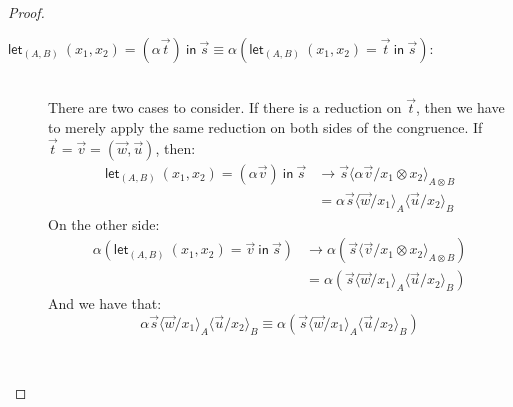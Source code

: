 \documentclass[runningheads,orivec]{llncs}
\newcommand\ansubst[2]{\ensuremath{\langle #1 \rangle_{#2}}}
\def\Pair#1#2{(#1,#2)} %
\def\letkeyword{\mathsf{let}}
\def\inkeyword{\mathsf{in}}
\def\LetP#1#2#3#4#5#6{\letkeyword_{\Pair{#2}{#4}}~\Pair{#1}{#3}=#5~\inkeyword~#6}
\def\evalone{\rightarrow}
\begin{document}
\begin{proof}
\begin{description}
    \item[$\LetP{x_1}{A}{x_2}{B}{(\alpha \vec{t})}{\vec{s}}\equiv\alpha(\LetP{x_1}{A}{x_2}{B}{\vec{t}}{\vec{s}})$:] \hfill\\
    There are two cases to consider. If there is a reduction on $\vec{t}$, then we have to merely apply the same reduction on both sides of the congruence. If $\vec{t}=\vec{v}=\Pair{\vec{w}}{\vec{u}}$, then:
    \begin{align*}
      \LetP{x_1}{A}{x_2}{B}{(\alpha\vec{v})}{\vec{s}}&\evalone\vec{s}\ansubst{\alpha\vec{v}/ x_1\otimes x_2}{A\otimes B}\\
      &= \alpha \vec{s}\ansubst{\vec{w}/ x_1}{A}\ansubst{\vec{u}/ x_2}{B}
    \end{align*}
    On the other side:
    \begin{align*}
      \alpha(\LetP{x_1}{A}{x_2}{B}{\vec{v}}{\vec{s}})&\evalone
      \alpha (\vec{s}\ansubst{\vec{v}/ x_1\otimes x_2}{A\otimes B})\\
      &=\alpha(\vec{s}\ansubst{\vec{w}/ x_1}{A}\ansubst{\vec{u}/ x_2}{B})
    \end{align*}
    And we have that:
    \[
      \alpha\vec{s}\ansubst{\vec{w}/ x_1}{A}\ansubst{\vec{u}/ x_2}{B}\equiv \alpha(\vec{s}\ansubst{\vec{w}/ x_1}{A}\ansubst{\vec{u}/ x_2}{B})
    \]
    
    \item[\parbox{\linewidth}{\begin{align*}
    &\LetP{x_1}{A}{x_2}{B}{\vec{t}+\vec{s}}{\vec{r}}\equiv\\
    &(\LetP{x_1}{A}{x_2}{B}{\vec{t}}{\vec{r}}) +
    (\LetP{x_1}{A}{x_2}{B}{\vec{s}}{\vec{r}})
    \end{align*}}:]\hfill\\
    

\end{description}
\end{proof}
\end{document}
